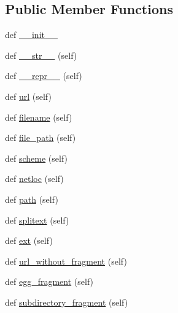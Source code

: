 \subsection*{Public Member Functions}
\begin{DoxyCompactItemize}
\item 
def \hyperlink{classpip_1_1__internal_1_1models_1_1link_1_1Link_a12a3ebf030fc24233dd1e55a1b224377}{\+\_\+\+\_\+init\+\_\+\+\_\+}
\item 
def \hyperlink{classpip_1_1__internal_1_1models_1_1link_1_1Link_aaec968097a8fdaf9ae118fc112073a53}{\+\_\+\+\_\+str\+\_\+\+\_\+} (self)
\item 
def \hyperlink{classpip_1_1__internal_1_1models_1_1link_1_1Link_aa19d0a7c916f32693fd55da0bd5b4d3b}{\+\_\+\+\_\+repr\+\_\+\+\_\+} (self)
\item 
def \hyperlink{classpip_1_1__internal_1_1models_1_1link_1_1Link_acf2e1c7ec34152ff70d1f5021cf9364e}{url} (self)
\item 
def \hyperlink{classpip_1_1__internal_1_1models_1_1link_1_1Link_ae1daa5521205c1e735c9ffc1d9305d80}{filename} (self)
\item 
def \hyperlink{classpip_1_1__internal_1_1models_1_1link_1_1Link_a38a48986b391cc13d303ef3f53bda70b}{file\+\_\+path} (self)
\item 
def \hyperlink{classpip_1_1__internal_1_1models_1_1link_1_1Link_adaf853996ca5affadfbd3f45e6c81c24}{scheme} (self)
\item 
def \hyperlink{classpip_1_1__internal_1_1models_1_1link_1_1Link_a67c4e7c416f4464b2cf43f69a4fd32d5}{netloc} (self)
\item 
def \hyperlink{classpip_1_1__internal_1_1models_1_1link_1_1Link_a92cb97c6d8284494fb9993217d96f562}{path} (self)
\item 
def \hyperlink{classpip_1_1__internal_1_1models_1_1link_1_1Link_a0fa52a4e3255d10a6b12f1c0cf36b833}{splitext} (self)
\item 
def \hyperlink{classpip_1_1__internal_1_1models_1_1link_1_1Link_aada48abde1e3099cc79dcb85239edbdd}{ext} (self)
\item 
def \hyperlink{classpip_1_1__internal_1_1models_1_1link_1_1Link_a6434cb3913c92bef0cf53e9ad79c4ec0}{url\+\_\+without\+\_\+fragment} (self)
\item 
def \hyperlink{classpip_1_1__internal_1_1models_1_1link_1_1Link_a81735555dad9efc828b022483f563732}{egg\+\_\+fragment} (self)
\item 
def \hyperlink{classpip_1_1__internal_1_1models_1_1link_1_1Link_a926c94932fce21096963affe8f4846eb}{subdirectory\+\_\+fragment} (self)

\end{DoxyCompactItemize}

